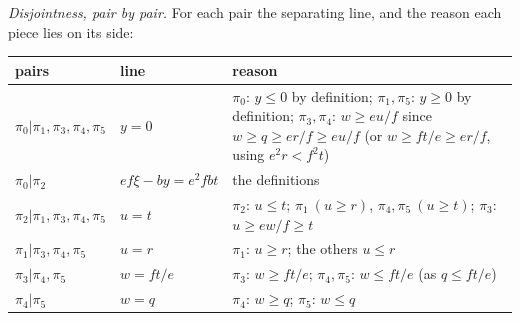 \documentclass[11pt,reqno]{amsart}
\theoremstyle{plain}
\theoremstyle{definition}
\begin{document}
\emph{Disjointness, pair by pair.} For each pair the separating line, and the reason each piece lies on its side:
\begin{center}\small
\begin{tabular}{@{}p{3.3cm}p{3.1cm}p{6.2cm}@{}}
\toprule
pairs & line & reason\\
\midrule
$\pi_0|\pi_1,\pi_3,\pi_4,\pi_5$ & $y=0$ & $\pi_0$: $y\le0$ by definition; $\pi_1,\pi_5$: $y\ge0$ by definition; $\pi_3,\pi_4$: $w\ge eu/f$ since $w\ge q\ge er/f\ge eu/f$ (or $w\ge ft/e\ge er/f$, using $e^2r<f^2t$)\\
$\pi_0|\pi_2$ & $ef\xi-by=e^2fbt$ & the definitions\\
$\pi_2|\pi_1,\pi_3,\pi_4,\pi_5$ & $u=t$ & $\pi_2$: $u\le t$; $\pi_1\ (u\ge r)$, $\pi_4,\pi_5\ (u\ge t)$; $\pi_3$: $u\ge ew/f\ge t$\\
$\pi_1|\pi_3,\pi_4,\pi_5$ & $u=r$ & $\pi_1$: $u\ge r$; the others $u\le r$\\
$\pi_3|\pi_4,\pi_5$ & $w=ft/e$ & $\pi_3$: $w\ge ft/e$; $\pi_4,\pi_5$: $w\le ft/e$ (as $q\le ft/e$)\\
$\pi_4|\pi_5$ & $w=q$ & $\pi_4$: $w\ge q$; $\pi_5$: $w\le q$\\
\bottomrule
\end{tabular}
\end{center}
\end{document}
